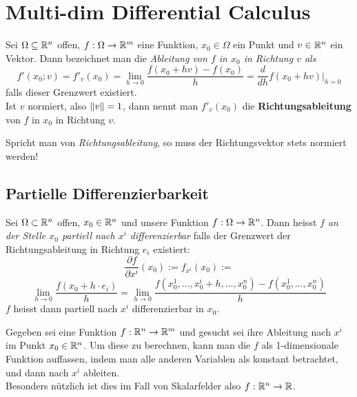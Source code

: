 \chapter{Multi-dim Differential Calculus}

\begin{definition}[Richtungsableitung]
    Sei $\Omega \subseteq \mathbb{R}^n$ offen, $f:\Omega \to \mathbb{R}^m$ eine Funktion, $x_0 \in \Omega$ ein Punkt und $v \in \mathbb{R}^n$ ein Vektor. Dann bezeichnet man die \textit{Ableitung von $f$ in $x_0$ in Richtung $v$ als}
    $$ f'(x_0; v) = f'_v(x_0) =  \lim_{h \to 0} \frac{f(x_0 + hv)-f(x_0)}{h} = \frac{d}{dh} f(x_0 + hv) \bigg|_{h=0}$$
    falls dieser Grenzwert existiert. \\
    Ist $v$ normiert, also $\lVert v\rVert =1$, dann nennt man $f'_v(x_0)$ die \textbf{Richtungsableitung} von $f$ in $x_0$ in Richtung $v$.
\end{definition}

\begin{remark}
    Spricht man von \textit{Richtungsableitung}, so muss der Richtungsvektor stets normiert werden!
\end{remark}

\section{Partielle Differenzierbarkeit}

\begin{definition}
    Sei $\Omega \subset \mathbb{R}^n$ offen, $x_0 \in \mathbb{R}^n$ und unsere Funktion $f:\Omega \to \mathbb{R}^n$. Dann heisst \textit{$f$ an der Stelle $x_0$ partiell nach $x^i$ differenzierbar} falls der Grenzwert der Richtungsableitung in Richtung $e_i$ existiert:
    $$ \frac{\partial f}{\partial x^i}(x_0) := f_{x^i}(x_0) :=$$ $$\lim_{h\to 0} \frac{f(x_0+ h \cdot e_i)}{h} = \lim_{h\to 0} \frac{f(x_0^1, \dots, x_0^i + h, \dots, x_0^n) - f(x_0^1, \dots, x_0^n)}{h}$$
    $f$ heisst dann partiell nach $x^i$ differenzierbar in $x_0$.
\end{definition}

\begin{concept}
    Gegeben sei eine Funktion $f:\mathbb{R}^n \to \mathbb{R}^m$ und gesucht sei ihre Ableitung nach $x^i$ im Punkt $x_0 \in \mathbb{R}^n$. Um diese zu berechnen, kann man die $f$ als 1-dimensionale Funktion auffassen, indem man alle anderen Variablen als konstant betrachtet, und dann nach $x^i$ ableiten.\\
    Besonders nützlich ist dies im Fall von Skalarfelder also $f: \mathbb{R}^n \to \mathbb{R}$.
\end{concept}

